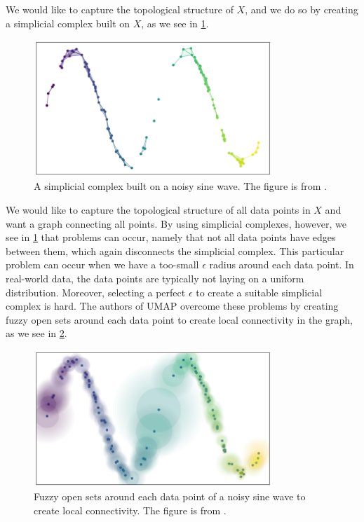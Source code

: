 We would like to capture the topological structure of $X$, and we do so by creating a simplicial complex built on $X$, as we see in \cref{fig:how_umap_works_basic_graph}.
\begin{figure}[H]
    \centering
    \includegraphics[width=0.8\textwidth]{thesis/figures/how_umap_works_basic_graph.png}
    \caption{A simplicial complex built on a noisy sine wave. The figure is from \cite{how-umap-works-2018}.}
    \label{fig:how_umap_works_basic_graph}
\end{figure}
We would like to capture the topological structure of all data points in $X$ and want a graph connecting all points. By using simplicial complexes, however, we see in \cref{fig:how_umap_works_basic_graph} that problems can occur, namely that not all data points have edges between them, which again disconnects the simplicial complex. This particular problem can occur when we have a too-small $\epsilon$ radius around each data point. In real-world data, the data points are typically not laying on a uniform distribution. Moreover, selecting a perfect $\epsilon$ to create a suitable simplicial complex is hard. The authors of UMAP overcome these problems by creating fuzzy open sets around each data point to create local connectivity in the graph, as we see in \cref{fig:how_umap_works_umap_open_cover}.
\begin{figure}[H]
    \centering
    \includegraphics[width=0.8\textwidth]{thesis/figures/how_umap_works_umap_open_cover.png}
    \caption{Fuzzy open sets around each data point of a noisy sine wave to create local connectivity. The figure is from \cite{how-umap-works-2018}.}
    \label{fig:how_umap_works_umap_open_cover}
\end{figure}
